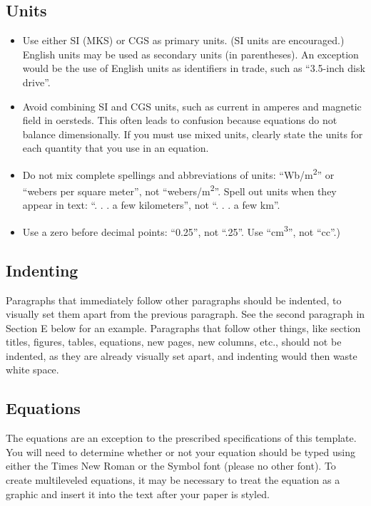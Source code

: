 \documentclass[conference, letter]{IEEEtran}
\begin{document}
\subsection{Units}
\begin{itemize}
\item Use either SI (MKS) or CGS as primary units. (SI units are encouraged.) English units may be used as secondary units (in parentheses). An exception would be the use of English units as identifiers in trade, such as ``3.5-inch disk drive''.
\item Avoid combining SI and CGS units, such as current in amperes and magnetic field in oersteds. This often leads to confusion because equations do not balance dimensionally. If you must use mixed units, clearly state the units for each quantity that you use in an equation.
\item Do not mix complete spellings and abbreviations of units: ``Wb/m\textsuperscript{2}'' or ``webers per square meter'', not ``webers/m\textsuperscript{2}''. Spell out units when they appear in text: ``. . . a few kilometers'', not ``. . . a few km''.
\item Use a zero before decimal points: ``0.25'', not ``.25''. Use ``cm\textsuperscript{3}'', not ``cc''.)
\end{itemize}

\subsection{Indenting}
Paragraphs that immediately follow other paragraphs should be indented, to visually set them apart from the previous paragraph. See the second paragraph in Section E below for an example. Paragraphs that follow other things, like section titles, figures, tables, equations, new pages, new columns, etc., should not be indented, as they are already visually set apart, and indenting would then waste white space.

\subsection{Equations}
The equations are an exception to the prescribed specifications of this template. You will need to determine whether or not your equation should be typed using either the Times New Roman or the Symbol font (please no other font). To create multileveled equations, it may be necessary to treat the equation as a graphic and insert it into the text after your paper is styled.
\end{document}
